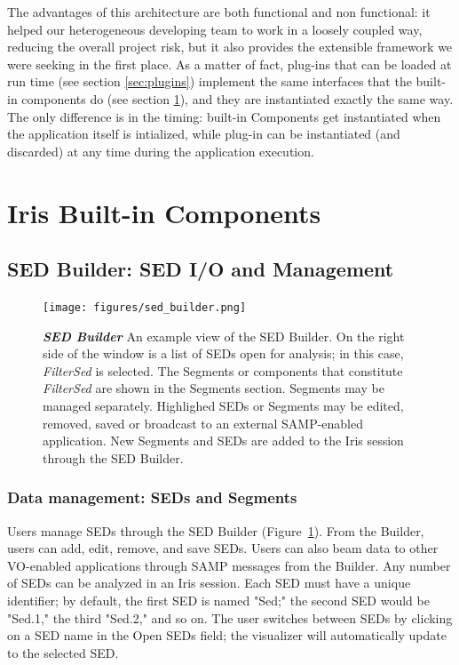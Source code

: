 \documentclass[5p]{elsarticle}
\begin{document}
The advantages of this architecture are both functional and non functional: it helped our heterogeneous developing team to work in a loosely coupled way, reducing the overall project risk, but it also provides the extensible framework we were seeking in the first place. As a matter of fact, plug-ins that can be loaded at run time (see section \ref{sec:plugins}) implement the same interfaces that the built-in components do (see section \ref{sec:components}), and they are instantiated exactly the same way. The only difference is in the timing: built-in Components get instantiated when the application itself is intialized, while plug-in can be instantiated (and discarded) at any time during the application execution.

\section{Iris Built-in Components}
\label{sec:components}

\subsection{SED Builder: SED I/O and Management}

\begin{figure}
\begin{center}
\texttt{[image: figures/sed\_builder.png]}
\caption{\textit{\textbf{\label{fig:sed_builder} SED Builder}} An example view of the SED Builder. On the right side of the window is a list of SEDs open for analysis; in this case, \textit{FilterSed} is selected. The Segments or components that constitute \textit{FilterSed} are shown in the Segments section. Segments may be managed separately. Highlighed SEDs or Segments may be edited, removed, saved or broadcast to an external SAMP-enabled application. New Segments and SEDs are added to the Iris session through the SED Builder. }
\end{center}
\end{figure}

\subsubsection{Data management: SEDs and Segments}
Users manage SEDs through the SED Builder (Figure~\ref{fig:sed_builder}). From the Builder, users can add, edit, remove, and save SEDs. Users can also beam data to other VO-enabled applications through SAMP messages from the Builder. Any number of SEDs can be analyzed in an Iris session. Each SED must have a unique identifier; by default, the first SED is named "Sed;" the second SED would be "Sed.1," the third "Sed.2," and so on. The user switches between SEDs by clicking on a SED name in the Open SEDs field; the visualizer will automatically update to the selected SED.
\end{document}
